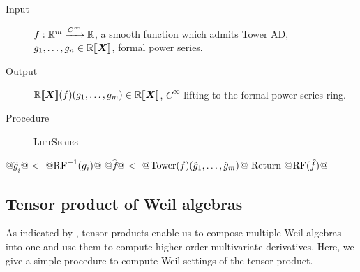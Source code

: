 \begin{algorithm}\label{lift-series}
\hfill\vspace{-.25em}
\begin{description}
  \item[Input]
    $f: \mathbb{R}^m \xrightarrow{C^\infty} \mathbb{R}$, a smooth function which admits Tower AD,
    $g_1, \dots, g_n \in \mathord{\mathbb{R}\llbracket\boldsymbol{X}\rrbracket}$, formal power series.
  \item[Output] $\mathord{\mathbb{R}\llbracket\boldsymbol{X}\rrbracket}(f)(g_1, \dots, g_m) \in \mathord{\mathbb{R}\llbracket\boldsymbol{X}\rrbracket}$, $C^\infty$-lifting to the formal power series ring.
  \item[Procedure] \textup{\textsc{LiftSeries}}
\end{description}
\begin{alg}
@$\hat{g}_i$@ <- @$\operatorname{RF}^{-1}(g_i)$@
@$\hat{f}$@ <- @$\mathord{\mathrm{Tower}}(f)(\hat{g}_1, \dots, \hat{g}_m)$@
Return @$\operatorname{RF}(\hat{f})$@
\end{alg}
\end{algorithm}

\subsection{Tensor product of Weil algebras}
\label{sec:tensor-algorithm}
As indicated by , tensor products enable us to compose multiple Weil algebras into one and use them to compute higher-order multivariate derivatives.
Here, we give a simple procedure to compute Weil settings of the tensor product.

